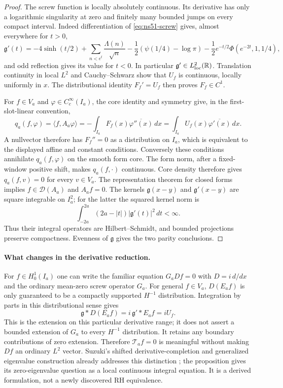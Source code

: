 \documentclass[11pt]{article}
\theoremstyle{remark}
\begin{document}
\begin{proof}
The screw function is locally absolutely continuous. Its derivative
has only a logarithmic singularity at zero and finitely many bounded
jumps on every compact interval. Indeed differentiation of
\eqref{eq:ns51-screw} gives, almost everywhere for $t>0$,
\begin{equation}\label{eq:ns51-screw-derivative}
 \mathfrak g'(t)=-4\sinh(t/2)
 +\sum_{n<e^t}\frac{\Lambda(n)}{\sqrt n}
 -\frac12(\psi(1/4)-\log\pi)
 -\frac12e^{-t/2}\Phi(e^{-2t},1,1/4),
\end{equation}
and odd reflection gives its value for $t<0$.
In particular $\mathfrak g'\in L^2_{\rm loc}(\mathbb R)$.
Translation continuity in local $L^2$ and Cauchy--Schwarz show that
$U_f$ is continuous, locally uniformly in $x$. The distributional
identity $F_f'=U_f$ then proves $F_f\in C^1$.

For $f\in V_a$ and $\varphi\in C_c^\infty(I_a)$, the core identity
and symmetry give, in the first-slot-linear convention,
\[
 q_a(f,\varphi)=\langle f,A_a\varphi\rangle
 =-\int_{I_a}F_f(x)\overline{\varphi''(x)}\,dx
 =\int_{I_a}U_f(x)\overline{\varphi'(x)}\,dx.
\]
A nullvector therefore has $F_f''=0$ as a distribution on $I_a$,
which is equivalent to the displayed affine and constant conditions.
Conversely these conditions annihilate $q_a(f,\varphi)$ on the smooth
form core. The form norm, after a fixed-window positive shift, makes
$q_a(f,\cdot)$ continuous. Core density therefore gives
$q_a(f,v)=0$ for every $v\in V_a$. The representation theorem for
closed forms implies $f\in\mathcal D(A_a)$ and $A_af=0$.
The kernels $\mathfrak g(x-y)$ and $\mathfrak g'(x-y)$ are square
integrable on $I_a^2$; for the latter the squared kernel norm is
\[
 \int_{-2a}^{2a}(2a-|t|)|\mathfrak g'(t)|^2\,dt<\infty.
\]
Thus their integral operators are Hilbert--Schmidt, and bounded
projections preserve compactness. Evenness of $\mathfrak g$ gives
the two parity conclusions.
\end{proof}

\paragraph{What changes in the derivative reduction.}
For $f\in H_0^1(I_a)$ one can write the familiar equation
$G_a Df=0$ with $D=i\,d/dx$ and the ordinary mean-zero screw operator
$G_a$. For general $f\in V_a$, $D(E_af)$ is only guaranteed to be a
compactly supported $H^{-1}$ distribution. Integration by parts in
this distributional sense gives
\[
 \mathfrak g*D(E_af)=i\,\mathfrak g'*E_af=iU_f.
\]
This is the extension on this particular derivative range; it does
not assert a bounded extension of $G_a$ to every $H^{-1}$ distribution.
It retains any boundary contributions of zero extension. Therefore
$\mathcal T_af=0$ is meaningful without making $Df$ an ordinary
$L^2$ vector. Suzuki's shifted derivative-completion and generalized
eigenvalue construction already addresses this distinction
\cite[Sections 8.3--8.5]{Suzuki2026}; the proposition gives its
zero-eigenvalue question as a local continuous integral equation.
It is a derived formulation, not a newly discovered RH equivalence.
\end{document}
